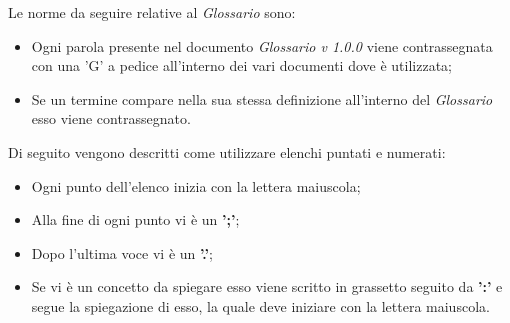Le norme da seguire relative al \textit{Glossario} sono:
\begin{itemize}
    \item Ogni parola presente nel documento \textit{Glossario v 1.0.0} viene contrassegnata con una 'G' a pedice all'interno dei vari documenti dove è utilizzata;
    \item Se un termine compare nella sua stessa definizione all'interno del \textit{Glossario } esso viene contrassegnato.
\end{itemize}

 \label{sec:elenchi_puntati_numerati}
Di seguito vengono descritti come utilizzare elenchi puntati e numerati:
\begin{itemize}
\item Ogni punto dell'elenco inizia con la lettera maiuscola;
\item Alla fine di ogni punto vi è un \textbf{';'};
\item Dopo l'ultima voce vi è un \textbf{'.'};
\item Se vi è un concetto da spiegare esso viene scritto in grassetto seguito da \textbf{':'} e segue la spiegazione di esso, la quale deve iniziare con la lettera maiuscola.
\end{itemize}

